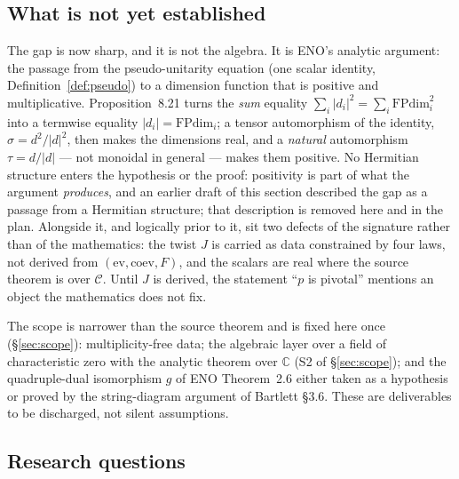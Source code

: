 \documentclass[11pt,a4paper]{article}
\theoremstyle{remark}
\newcommand{\C}{\mathcal{C}}
\newcommand{\FPdim}{\mathrm{FPdim}}
\newcommand{\Cx}{\mathbb{C}}
\begin{document}
\subsection{What is not yet established}\label{sec:whatnot}

The gap is now sharp, and it is not the algebra. It is ENO's analytic argument: the passage from
the pseudo-unitarity equation (one scalar identity, Definition~\ref{def:pseudo}) to a dimension
function that is positive and multiplicative. Proposition~8.21 turns the \emph{sum} equality
$\sum_i |d_i|^2 = \sum_i \FPdim_i^2$ into a termwise equality $|d_i| = \FPdim_i$; a tensor
automorphism of the identity, $\sigma = d^2/|d|^2$, then makes the dimensions real, and a
\emph{natural} automorphism $\tau = d/|d|$ --- not monoidal in general --- makes them positive.
No Hermitian structure enters the hypothesis or the proof: positivity is part of what the
argument \emph{produces}, and an earlier draft of this section described the gap as a passage
from a Hermitian structure; that description is removed here and in the plan.
Alongside it, and logically prior to it, sit two defects of the signature rather than of the
mathematics: the twist $J$ is carried as data constrained by four laws, not derived from
$(\mathrm{ev}, \mathrm{coev}, F)$, and the scalars are real where the source theorem is over
$\C$. Until $J$ is derived, the statement ``$p$ is pivotal'' mentions an object the
mathematics does not fix.

The scope is narrower than the source theorem and is fixed here once (\S\ref{sec:scope}):
multiplicity-free data; the algebraic layer over a field of characteristic zero with the
analytic theorem over $\Cx$ (S2 of \S\ref{sec:scope}); and the quadruple-dual isomorphism $g$
of ENO Theorem~2.6 either taken as a hypothesis or proved by the string-diagram argument of
Bartlett \S3.6. These are deliverables to be discharged, not silent assumptions.

\subsection{Research questions}
\end{document}
